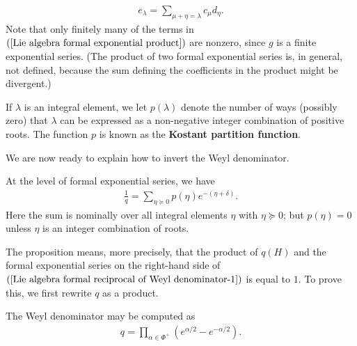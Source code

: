 \begin{align}\label{Lie algebra formal exponential product}
e_\lambda=\sum_{\mu+\eta=\lambda}c_\mu d_\eta.
\end{align}
Note that only finitely many of the terms in $(\ref{Lie algebra formal exponential product})$ are nonzero, since $g$ is a finite exponential series. (The product of two formal exponential series is, in general, not defined, because the sum defining the coefficients in the product might be divergent.)
\begin{definition}
If $\lambda$ is an integral element, we let $p(\lambda)$ denote the number of ways (possibly zero) that $\lambda$ can be expressed as a non-negative integer combination of positive roots. The function $p$ is known as the \textbf{Kostant partition function}.
\end{definition}
We are now ready to explain how to invert the Weyl denominator.
\begin{proposition}\label{Lie algebra formal reciprocal of Weyl denominator}
At the level of formal exponential series, we have
\begin{align}\label{Lie algebra formal reciprocal of Weyl denominator-1}
\frac{1}{q}=\sum_{\eta\succeq 0}p(\eta)e^{-(\eta+\delta)}.
\end{align}
Here the sum is nominally over all integral elements $\eta$ with $\eta\succeq 0$; but $p(\eta)=0$ unless $\eta$ is an integer combination of roots.
\end{proposition}
The proposition means, more precisely, that the product of $q(H)$ and the formal exponential series on the right-hand side of $(\ref{Lie algebra formal reciprocal of Weyl denominator-1})$ is equal to $1$. To prove this, we first rewrite $q$ as a product.
\begin{lemma}\label{Lie algebra product form of Weyl denominator}
The Weyl denominator may be computed as
\begin{align}\label{Lie algebra product form of Weyl denominator-1}
q=\prod_{\alpha\in\Phi^+}(e^{\alpha/2}-e^{-\alpha/2}).
\end{align}
\end{lemma}
